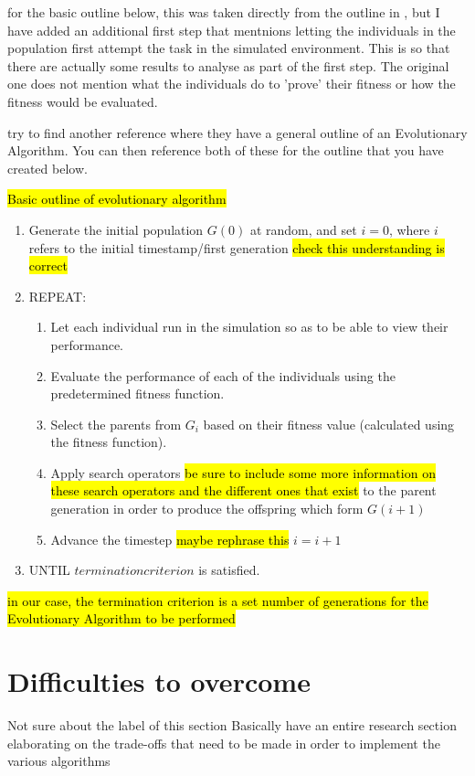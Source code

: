 for the basic outline below, this was taken directly from the outline in \cite{XinYao1999}, but I have added an additional first step that mentnions letting the individuals in the population first attempt the task in the simulated environment. This is so that there are actually some results to analyse as part of the first step. The original one does not mention what the individuals do to 'prove' their fitness or how the fitness would be evaluated.

try to find another reference where they have a general outline of an Evolutionary Algorithm. You can then reference both of these for the outline that you have created below.

\hl{Basic outline of evolutionary algorithm}
\begin{enumerate} \label{EA-Overview}
	\item Generate the initial population $G(0)$ at random, and set $i = 0$, where $i$ refers to the initial timestamp/first generation \hl{check this understanding is correct}
	\item REPEAT:
		\begin{enumerate}
			\item Let each individual run in the simulation so as to be able to view their performance.
			\item Evaluate the performance of each of the individuals using the predetermined fitness function.
			\item Select the parents from $G_i$ based on their fitness value (calculated using the fitness function).
			\item Apply search operators \hl{be sure to include some more information on these search operators and the different ones that exist} to the parent generation in order to produce the offspring which form $G(i+1)$
			\item Advance the timestep \hl{maybe rephrase this} $i=i+1$
		\end{enumerate}
	\item UNTIL $termination criterion$ is satisfied.
\end{enumerate}

\hl{in our case, the termination criterion is a set number of generations for the Evolutionary Algorithm to be performed}



\section{Difficulties to overcome}
Not sure about the label of this section
Basically have an entire research section elaborating on the trade-offs that need to be made in order to implement the various algorithms

